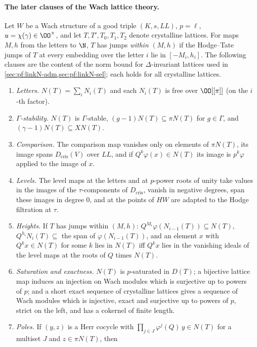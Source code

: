 \paragraph{The later clauses of the Wach lattice theory.}
Let $W$ be a Wach structure of a good triple $(K,s,\mathit{LL})$, $p=\ell$, $u=\chi(\gamma)\in\OO^\times$, and let $T,T',T_0,T_1,T_2$ denote
crystalline lattices. For maps $M,h$ from the letters to $\N$, $T$ has jumps \emph{within $(M,h)$} if the Hodge--Tate jumps of $T$ at every
embedding over the letter $i$ lie in $[-M_i,h_i]$. The following clauses are the content of the norm bound for $\Delta$-invariant lattices
used in \cref{sec:pf:linkN-adm,sec:pf:linkN-sel}; each holds for all crystalline lattices.
\begin{enumerate}
\item[(P1)] \emph{Letters.} $N(T)=\sum_iN_i(T)$ and each $N_i(T)$ is free over $\OO[[\pi]]$ (on the $i$-th factor).
\item[(P2)] \emph{$\Gamma$-stability.} $N(T)$ is $\Gamma$-stable, $(g-1)N(T)\subseteq\pi N(T)$ for $g\in\Gamma$, and $(\gamma-1)N(T)\subseteq XN(T)$.
\item[(P3)] \emph{Comparison.} The comparison map vanishes only on elements of $\pi N(T)$, its image spans $D_{\mathrm{cris}}(V)$ over
  $\mathit{LL}$, and if $Q^k\varphi(x)\in N(T)$ its image is $p^k\varphi$ applied to the image of $x$.
\item[(P4)] \emph{Levels.} The level maps at the letters and at $p$-power roots of unity take values in the images of the $\tau$-components of
  $D_{\mathrm{cris}}$, vanish in negative degrees, span these images in degree $0$, and at the points of $HW$ are adapted to the Hodge
  filtration at $\tau$.
\item[(P5)] \emph{Heights.} If $T$ has jumps within $(M,h)$: $Q^{M_i}\varphi(N_{i-1}(T))\subseteq N(T)$, $Q^{h_i}N_i(T)\subseteq$ the span of
  $\varphi(N_{i-1}(T))$, and an element $x$ with $Q^kx\in N(T)$ for some $k$ lies in $N(T)$ iff $Q^kx$ lies in the vanishing ideals of the level
  maps at the roots of $Q$ times $N(T)$.
\item[(P6)] \emph{Saturation and exactness.} $N(T)$ is $p$-saturated in $D(T)$; a bijective lattice map induces an injection on Wach modules
  which is surjective up to powers of $p$; and a short exact sequence of crystalline lattices gives a sequence of Wach modules which is
  injective, exact and surjective up to powers of $p$, strict on the left, and has a cokernel of finite length.
\item[(P7)] \emph{Poles.} If $(y,z)$ is a Herr cocycle with $\prod_{j\in J}\varphi^j(Q)\,y\in N(T)$ for a multiset $J$ and $z\in\pi N(T)$, then

\end{enumerate}
